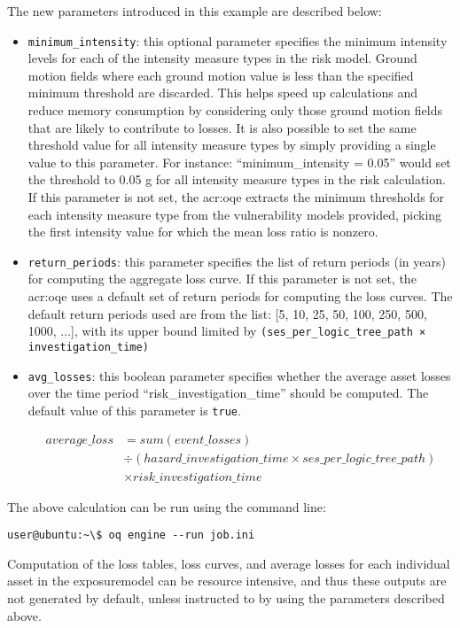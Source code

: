 The new parameters introduced in this example are described below:

\begin{itemize}

  \item \Verb+minimum_intensity+: this optional parameter specifies the minimum
    intensity levels for each of the intensity measure types in the risk model.
    Ground motion fields where each ground motion value is less than the 
    specified minimum threshold are discarded. This helps speed up calculations
    and reduce memory consumption by considering only those ground motion fields
    that are likely to contribute to losses. It is also possible to set the same
    threshold value for all intensity measure types by simply providing a single
    value to this parameter. For instance: ``minimum\_intensity = 0.05'' would
    set the threshold to 0.05 g for all intensity measure types in the risk 
    calculation.
    If this parameter is not set, the \glsdesc{acr:oqe} extracts the minimum
    thresholds for each intensity measure type from the vulnerability
    models provided, picking the first intensity value for which the mean loss
    ratio is nonzero.

  \item \Verb+return_periods+: this parameter specifies the list of return
    periods (in years) for computing the aggregate loss curve.
    If this parameter is not set, the \glsdesc{acr:oqe} uses a default set of
    return periods for computing the loss curves. The default return periods
    used are from the list: [5, 10, 25, 50, 100, 250, 500, 1000, ...], with 
    its upper bound limited by \Verb+(ses_per_logic_tree_path × investigation_time)+

  \item \Verb+avg_losses+: this boolean parameter specifies whether the average
    asset losses over the time period ``risk\_investigation\_time'' should be
    computed. The default value of this parameter is \Verb+true+.

    \begin{equation*}
    \begin{split}
    average\_loss & = sum(event\_losses) \\
                 & \div (hazard\_investigation\_time \times ses\_per\_logic\_tree\_path) \\
                 & \times risk\_investigation\_time
    \end{split}
    \end{equation*}

\end{itemize}

The above calculation can be run using the command line:

\begin{verbatim}
user@ubuntu:~\$ oq engine --run job.ini
\end{verbatim}

Computation of the loss tables, loss curves, and average losses for each
individual \gls{asset} in the \gls{exposuremodel} can be resource intensive,
and thus these outputs are not generated by default, unless instructed to by
using the parameters described above.
